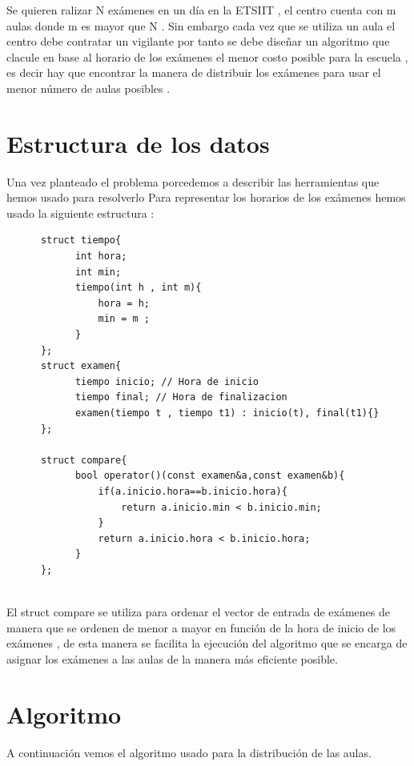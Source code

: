\documentclass[11pt,openany]{book}
\begin{document}
Se quieren ralizar N exámenes en un día en la ETSIIT , el centro cuenta con m aulas donde m es mayor
que N . Sin embargo cada vez que se utiliza un aula el centro debe contratar un vigilante por tanto 
se debe diseñar un algoritmo que clacule en base al horario de los exámenes el menor costo posible 
para la escuela , es decir hay que encontrar la manera de distribuir los exámenes para usar el menor número
de aulas posibles .

\section{Estructura de los datos}
Una vez planteado el problema porcedemos a describir las herramientas que hemos usado para resolverlo 
Para representar los horarios de los exámenes hemos usado la siguiente estructura :

\begin{lstlisting}
      struct tiempo{
            int hora;
            int min;
            tiempo(int h , int m){
                hora = h;
                min = m ;
            }
      };
      struct examen{
            tiempo inicio; // Hora de inicio
            tiempo final; // Hora de finalizacion
            examen(tiempo t , tiempo t1) : inicio(t), final(t1){}
      };
        
      struct compare{
            bool operator()(const examen&a,const examen&b){
                if(a.inicio.hora==b.inicio.hora){
                    return a.inicio.min < b.inicio.min;
                }
                return a.inicio.hora < b.inicio.hora;
            }
      };
        
\end{lstlisting}

El struct compare se utiliza para ordenar el vector de entrada de exámenes de manera que se ordenen
de menor a mayor en función de la hora de inicio de los exámenes , de esta manera se facilita la
ejecución del algoritmo que se encarga de asignar los exámenes a las aulas de la manera más eficiente
posible.

\section{Algoritmo}

A continuación vemos el algoritmo usado para la distribución de las aulas.
\end{document}
